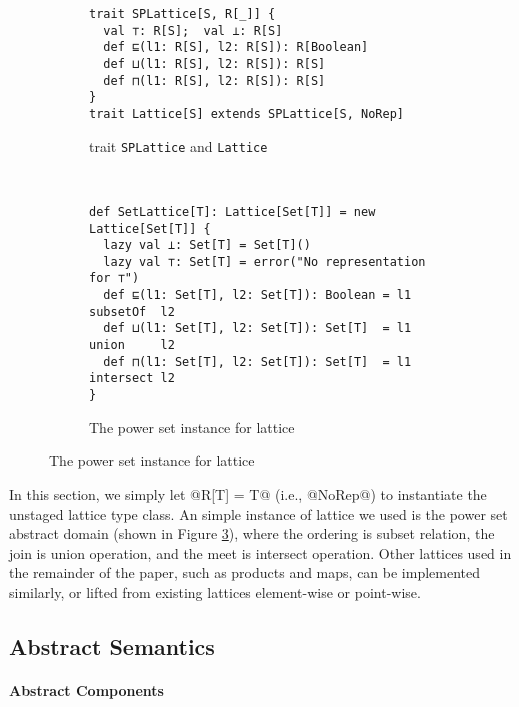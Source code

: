 \begin{figure}[h!]
  \centering
  \begin{subfigure}[b]{0.45\textwidth}
  \begin{lstlisting}[style=small]
trait SPLattice[S, R[_]] {
  val ⊤: R[S];  val ⊥: R[S]
  def ⊑(l1: R[S], l2: R[S]): R[Boolean]
  def ⊔(l1: R[S], l2: R[S]): R[S]
  def ⊓(l1: R[S], l2: R[S]): R[S]
}
trait Lattice[S] extends SPLattice[S, NoRep]
  \end{lstlisting}
  \caption{trait \texttt{SPLattice} and \texttt{Lattice}} \label{fig:splattice}
  \end{subfigure}
  ~
  \begin{subfigure}[b]{0.6\textwidth}
\begin{lstlisting}[style=small]
def SetLattice[T]: Lattice[Set[T]] = new Lattice[Set[T]] {
  lazy val ⊥: Set[T] = Set[T]()
  lazy val ⊤: Set[T] = error("No representation for ⊤")
  def ⊑(l1: Set[T], l2: Set[T]): Boolean = l1 subsetOf  l2
  def ⊔(l1: Set[T], l2: Set[T]): Set[T]  = l1 union     l2
  def ⊓(l1: Set[T], l2: Set[T]): Set[T]  = l1 intersect l2
}
\end{lstlisting}
  \caption{The power set instance for lattice} \label{fig:powerset}
\end{subfigure}
\end{figure}

In this section, we simply let @R[T] = T@ (i.e., @NoRep@) to instantiate the
unstaged lattice type class. An simple instance of lattice we used is the power
set abstract domain (shown in Figure \ref{fig:powerset}), where the ordering is subset relation, the join is union
operation, and the meet is intersect operation.
Other lattices used in the remainder of the paper, such as products and maps, can be
implemented similarly, or lifted from existing lattices element-wise or
point-wise.

\subsection{Abstract Semantics}

\paragraph{Abstract Components}


